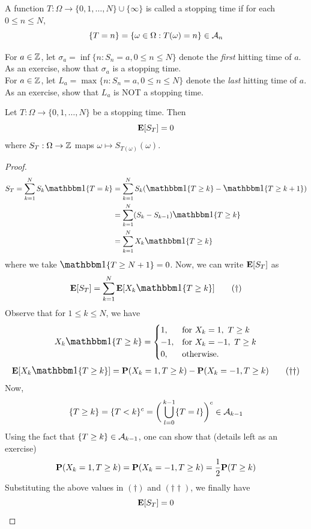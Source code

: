 \documentclass[main]{subfiles}
\begin{document}
\begin{definition}
    A function $ T:\Omega\to\{0, 1, \ldots, N\}\cup\{\infty\} $ is called a stopping time if for each $ 0\le n\le N $,  \[\{T=n\}=\{\omega\in\Omega:T(\omega)=n\}\in\SA_n\]
\end{definition}

\ex For $ a\in\Z $, let $ \sigma_a=\inf\{n: S_n=a, 0\le n\le N\} $ denote the \textit{first} hitting time of $ a $. As an exercise, show that $ \sigma_a $ is a stopping time.\\

\ex For $ a\in\Z $, let $ L_a=\max\{n: S_n=a, 0\le n\le N\}$ denote the \textit{last} hitting time of $ a $. As an exercise, show that $ L_a $ is NOT a stopping time.

\begin{theorem}
    Let $ T:\Omega\to\{0,1,\ldots,N\} $ be a stopping time. Then \[\E[S_T]=0\] where $ S_T:\Omega\to\Z $ maps $ \omega\mapsto S_{T(\omega)}(\omega) $.
\end{theorem}

\begin{proof}
    \begin{align*}
        S_T=\sum_{k=1}^NS_k\one\{T=k\}
         & = \sum_{k=1}^NS_k(\one\{T\ge k\}-\one\{T\ge k+1\}) \\
         & = \sum_{k=1}^N(S_k-S_{k-1})\one\{T\ge k\}          \\
         & = \sum_{k=1}^NX_k\one\{T\ge k\}
    \end{align*}
    where we take $ \mathlarger{\one}\{T\ge N+1\}=0 $. Now, we can write $ \E[S_T] $ as \[\E[S_T]=\sum_{k=1}^N\E[X_k\one\{T\ge k\}]\tag{$ \dagger $}\]
    Observe that for $ 1\le k\le N $, we have
    \[
        X_k\one\{T\ge k\} =
        \begin{cases}
            1,  & \text{for } X_k=1,\ T\ge k  \\
            -1, & \text{for } X_k=-1,\ T\ge k \\
            0,  & \text{otherwise.}
        \end{cases}
    \]
    \[\E[X_k\one\{T\ge k\}]=\P(X_k=1,T\ge k)-\P(X_k=-1,T\ge k) \tag{$ \dagger\dagger $}\]
    Now,
    \[\{T\ge k\}=\{T<k\}^c=\bigg(\bigcup_{l=0}^{k-1}\{T=l\}\bigg)^c\in\SA_{k-1}\]
    Using the fact that $ \{T\ge k\}\in\SA_{k-1} $, one can show that (details left as an exercise)
    \[\P(X_k=1,T\ge k)=\P(X_k=-1,T\ge k)=\frac{1}{2}\P(T\ge k)\]
    Substituting the above values in $ (\dagger) $ and $ (\dagger\dagger) $, we finally have
    \[\E[S_T]=0\]
\end{proof}
\end{document}
